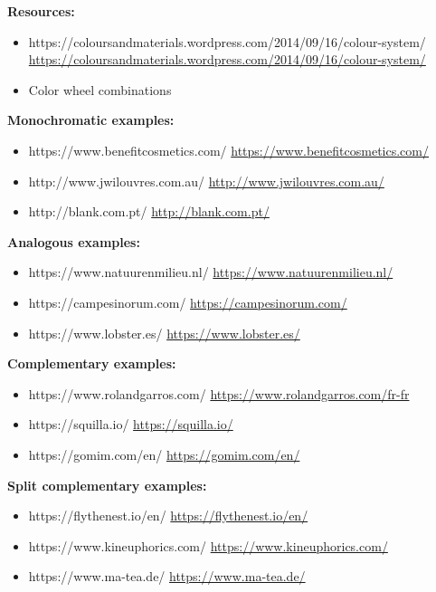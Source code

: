 \textbf{Resources:}

\begin{itemize}
\item https://coloursandmaterials.wordpress.com/2014/09/16/colour-system/ \url{https://coloursandmaterials.wordpress.com/2014/09/16/colour-system/}
\item Color wheel combinations
\end{itemize}

\textbf{Monochromatic examples:}

\begin{itemize}
\item https://www.benefitcosmetics.com/ \url{https://www.benefitcosmetics.com/} 
\item http://www.jwilouvres.com.au/ \url{http://www.jwilouvres.com.au/} 
\item http://blank.com.pt/ \url{http://blank.com.pt/}
\end{itemize}

\textbf{Analogous examples:}

\begin{itemize}
\item https://www.natuurenmilieu.nl/ \url{https://www.natuurenmilieu.nl/} 
\item https://campesinorum.com/ \url{https://campesinorum.com/} 
\item https://www.lobster.es/ \url{https://www.lobster.es/}
\end{itemize}

\textbf{Complementary examples:}

\begin{itemize}
\item https://www.rolandgarros.com/ \url{https://www.rolandgarros.com/fr-fr} 
\item https://squilla.io/ \url{https://squilla.io/} 
\item https://gomim.com/en/ \url{https://gomim.com/en/}
\end{itemize}

\textbf{Split complementary examples:}

\begin{itemize}
\item https://flythenest.io/en/ \url{https://flythenest.io/en/} 
\item https://www.kineuphorics.com/ \url{https://www.kineuphorics.com/} 
\item https://www.ma-tea.de/ \url{https://www.ma-tea.de/}
\end{itemize}

